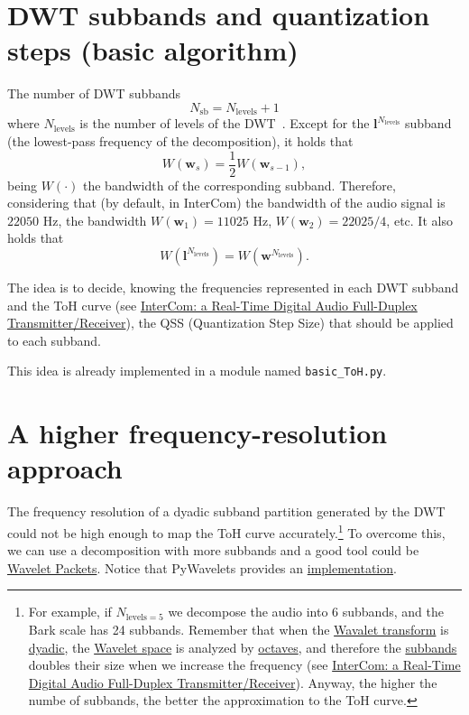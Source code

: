\section{DWT subbands and quantization steps (basic algorithm)}
The number of DWT subbands
\begin{equation}
  N_{\text{sb}} = N_{\text{levels}} + 1
\end{equation}
where $N_{\text{levels}}$ is the number of levels of the
DWT~\cite{vetterli1995wavelets}. Except for the
${\mathbf l}^{N_{\text{levels}}}$ subband (the lowest-pass frequency
of the decomposition), it holds that
\begin{equation}
  W({\mathbf w}_s) = \frac{1}{2}W({\mathbf w}_{s-1}),
\end{equation}
being $W(\cdot)$ the bandwidth of the corresponding
subband. Therefore, considering that (by default, in InterCom) the
bandwidth of the audio signal is $22050$ Hz, the bandwidth
$W({\mathbf w}_1)=11025$ Hz, $W({\mathbf w}_2)=22025/4$, etc. It also
holds that
\begin{equation}
  W({\mathbf l}^{N_{\text{levels}}}) = W({\mathbf w}^{N_{\text{levels}}}).
\end{equation}

The idea is to decide, knowing the frequencies represented in each DWT
subband and the ToH curve (see
\href{https://github.com/Tecnologias-multimedia/InterCom/blob/master/docs/2-hours_seminar.ipynb}{
  InterCom: a Real-Time Digital Audio Full-Duplex
  Transmitter/Receiver}), the QSS (Quantization Step Size) that should
be applied to each subband.

This idea is already implemented in a module named \verb|basic_ToH.py|.

\section{A higher frequency-resolution approach}
\label{sec:more_subbands}

The frequency resolution of a dyadic subband partition generated by
the DWT could not be high enough to map the ToH curve
accurately.\footnote{For example, if $N_{\text{levels}=5}$ we
  decompose the audio into 6 subbands, and the Bark scale has 24
  subbands. Remember that when the
  \href{https://en.wikipedia.org/wiki/Wavelet_transform}{Wavalet
    transform} is
  \href{https://en.wikipedia.org/wiki/Dyadic_rational}{dyadic}, the
  \href{https://en.wikipedia.org/wiki/Discrete_wavelet_transform}{Wavelet
    space} is analyzed by
  \href{https://en.wikipedia.org/wiki/Octave_band}{octaves}, and
  therefore the
  \href{https://en.wikipedia.org/wiki/Filter_bank}{subbands} doubles
  their size when we increase the frequency (see \href{https://github.com/Tecnologias-multimedia/InterCom/blob/master/docs/2-hours_seminar.ipynb}{
  InterCom: a Real-Time Digital Audio Full-Duplex
  Transmitter/Receiver}). Anyway, the higher the numbe of subbands, the better the
  approximation to the ToH curve.} To overcome this, we can use a
decomposition with more subbands and a good tool could be
\href{https://en.wikipedia.org/wiki/Wavelet_packet_decomposition}{Wavelet
  Packets}. Notice that PyWavelets provides an
\href{https://pywavelets.readthedocs.io/en/latest/ref/wavelet-packets.html}{implementation}.


